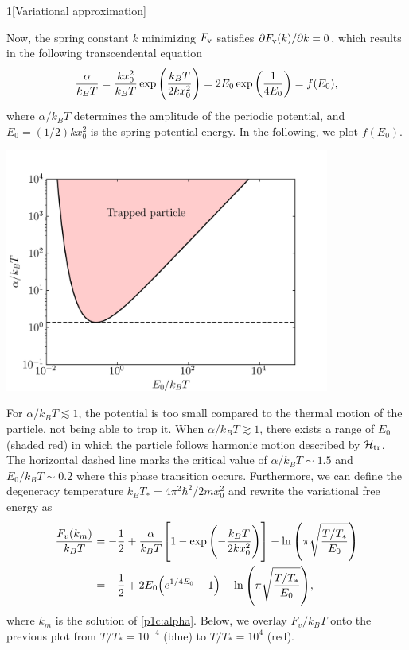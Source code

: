 \documentclass[12pt]{article}
\begin{document}
\begin{problem}{1}[Variational approximation]
\begin{solution}
\begin{equation}
\end{equation}
Now, the spring constant $k$ minimizing $F_{\text{v}}$ satisfies $\partial
F_{\text{v}}(k)/\partial k=0$, which results in the following transcendental equation
\begin{equation}\label{p1c:alpha}
    \frac{\alpha}{k_BT}=\frac{kx_0^2}{k_BT}\exp\qty(\frac{k_BT}{2kx_0^2})
    =2E_0\exp\qty(\frac1{4E_0})=f(E_0),
\end{equation}
where $\alpha/k_BT$ determines the amplitude of the periodic potential, and
$E_0=(1/2)kx_0^2$ is the spring potential energy. In the following, we plot
$f(E_0)$.
\begin{center}
    \includegraphics[width=0.8\textwidth]{p1c_1.png} 
\end{center}
For $\alpha/k_BT\lesssim1$, the potential is too small compared to the thermal
motion of the particle, not being able to trap it. When $\alpha/k_BT\gtrsim1$, 
there exists a range of $E_0$ (shaded red) in which the particle follows
harmonic motion described by $\mathcal{H}_{\text{tr}}$. The horizontal dashed line marks the
critical value of $\alpha/k_BT\sim1.5$ and $E_0/k_BT\sim 0.2$ where this phase 
transition occurs. Furthermore, we can define the degeneracy temperature
$k_BT_\ast=4\pi^2\hbar^2/2mx_0^2$ and rewrite the variational free energy as
\begin{align}
    \frac{F_v(k_m)}{k_BT}
    &=-\frac12+\frac{\alpha}{k_BT}\qty[1-\exp\qty(-\frac{k_BT}{2kx_0^2})]
    -\ln\qty(\pi\sqrt{\frac{T/T_\ast}{E_0}})\notag\\
    &=-\frac12+2E_0\qty(e^{1/4E_0}-1)-\ln\qty(\pi\sqrt{\frac{T/T_\ast}{E_0}}),
\end{align}
where $k_m$ is the solution of \eqref{p1c:alpha}. Below, we overlay $F_v/k_BT$
onto the previous plot from $T/T_\ast=10^{-4}$ (blue) to $T/T_\ast=10^4$ (red).

\end{solution}
\end{problem}
\end{document}
